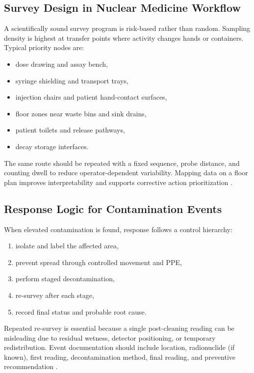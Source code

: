 \subsection{Survey Design in Nuclear Medicine Workflow}
A scientifically sound survey program is risk-based rather than random. Sampling density is highest at transfer points where activity changes hands or containers. Typical priority nodes are:
\begin{itemize}
    \item dose drawing and assay bench,
    \item syringe shielding and transport trays,
    \item injection chairs and patient hand-contact surfaces,
    \item floor zones near waste bins and sink drains,
    \item patient toilets and release pathways,
    \item decay storage interfaces.
\end{itemize}

The same route should be repeated with a fixed sequence, probe distance, and counting dwell to reduce operator-dependent variability. Mapping data on a floor plan improves interpretability and supports corrective action prioritization \cite{iaea_ssg46,aerb_rfsc_2025}.

\subsection{Response Logic for Contamination Events}
When elevated contamination is found, response follows a control hierarchy:
\begin{enumerate}
    \item isolate and label the affected area,
    \item prevent spread through controlled movement and PPE,
    \item perform staged decontamination,
    \item re-survey after each stage,
    \item record final status and probable root cause.
\end{enumerate}

Repeated re-survey is essential because a single post-cleaning reading can be misleading due to residual wetness, detector positioning, or temporary redistribution. Event documentation should include location, radionuclide (if known), first reading, decontamination method, final reading, and preventive recommendation \cite{iaea_ssg46,aerb_rpr2004}.

